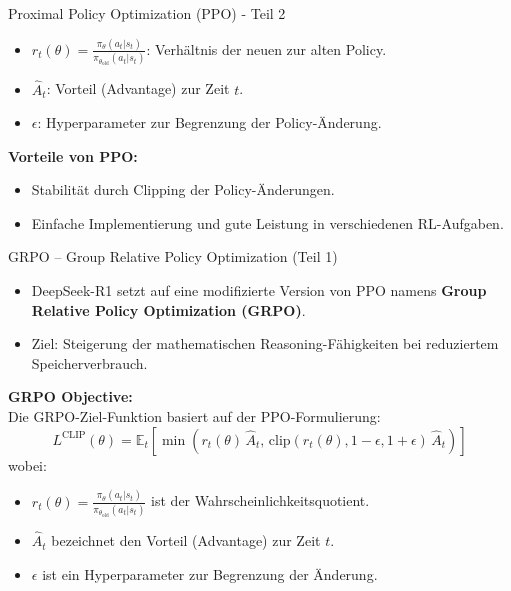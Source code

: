 \documentclass[aspectratio=1610, xcolor=dvipsnames, 9pt]{beamer}
\begin{document}
\begin{frame}{Proximal Policy Optimization (PPO) - Teil 2}
  \begin{itemize}
    \item \( r_t(\theta) = \frac{\pi_\theta(a_t|s_t)}{\pi_{\theta_{\text{old}}}(a_t|s_t)} \): Verhältnis der neuen zur alten Policy.
    \item \( \hat{A}_t \): Vorteil (Advantage) zur Zeit \( t \).
    \item \( \epsilon \): Hyperparameter zur Begrenzung der Policy-Änderung.
  \end{itemize}
  \vspace{0.5cm}
  \textbf{Vorteile von PPO:}
  \begin{itemize}
    \item Stabilität durch Clipping der Policy-Änderungen.
    \item Einfache Implementierung und gute Leistung in verschiedenen RL-Aufgaben.
  \end{itemize}
\end{frame}

\begin{frame}{GRPO – Group Relative Policy Optimization (Teil 1)}
  \begin{itemize}
      \item DeepSeek-R1 setzt auf eine modifizierte Version von PPO namens \textbf{Group Relative Policy Optimization (GRPO)}.
      \item Ziel: Steigerung der mathematischen Reasoning-Fähigkeiten bei reduziertem Speicherverbrauch.
  \end{itemize}
  \vspace{0.3cm}
  \textbf{GRPO Objective:}\\[0.2cm]
  Die GRPO-Ziel-Funktion basiert auf der PPO-Formulierung:
  \[
  L^{\mathrm{CLIP}}(\theta) = \mathbb{E}_{t} \left[ \min \left( r_{t}(\theta) \,\hat{A}_{t},\, \mathrm{clip}\left(r_{t}(\theta), 1-\epsilon, 1+\epsilon \right) \,\hat{A}_{t} \right) \right]
  \]
  wobei:
  \begin{itemize}
      \item \( r_{t}(\theta) = \frac{\pi_{\theta}(a_t|s_t)}{\pi_{\theta_{\mathrm{old}}}(a_t|s_t)} \) ist der Wahrscheinlichkeitsquotient.
      \item \( \hat{A}_{t} \) bezeichnet den Vorteil (Advantage) zur Zeit \( t \).
      \item \( \epsilon \) ist ein Hyperparameter zur Begrenzung der Änderung.
  \end{itemize}
\end{frame}
\end{document}
